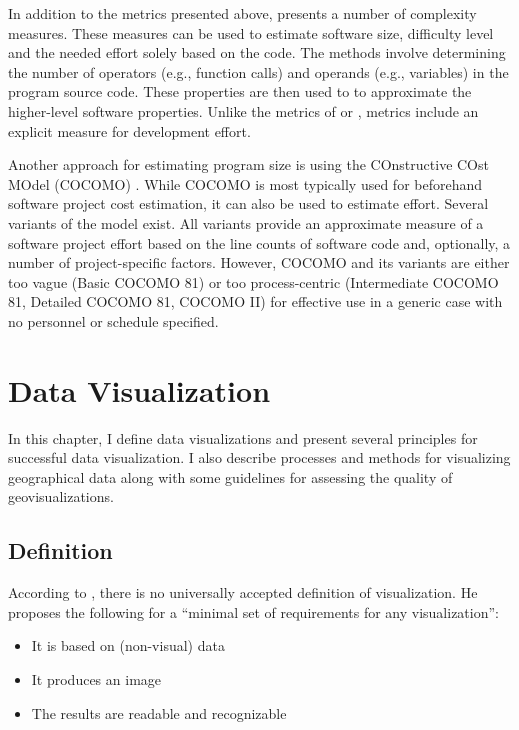 In addition to the metrics presented above, \citet{halstead_elements_1977} presents a number of complexity measures. These measures can be used to estimate software size, difficulty level and the needed effort solely based on the code. The methods involve determining the number of operators (e.g., function calls) and operands (e.g., variables) in the program source code. These properties are then used to to approximate the higher-level software properties. Unlike the metrics of \citeauthor{mccabe_complexity_1976} or \citeauthor{fenton_software_1998}, \citeauthor{halstead_elements_1977} metrics include an explicit measure for development effort.

Another approach for estimating program size is using the COnstructive COst MOdel (COCOMO) \citep{boehm_software_1981}. While COCOMO is most typically used for beforehand software project cost estimation, it can also be used to estimate effort. Several variants of the model exist. All variants provide an approximate measure of a software project effort based on the line counts of software code and, optionally, a number of  project-specific factors. However, COCOMO and its variants are either too vague (Basic COCOMO 81) or too process-centric (Intermediate COCOMO 81, Detailed COCOMO 81, COCOMO II) for effective use in a generic case with no personnel or schedule specified.

\chapter{Data Visualization}
\label{chapter:dataviz}

In this chapter, I define data visualizations and present several principles for successful data visualization. I also describe processes and methods for visualizing geographical data along with some guidelines for assessing the quality of geovisualizations.

\section{Definition}

According to \citet[chap.~3]{kosara_visualization_2007}, there is no universally accepted definition of visualization. He proposes the following for a ``minimal set of requirements for any visualization'':

\begin{itemize}
	\item It is based on (non-visual) data
	\item It produces an image
	\item The results are readable and recognizable
\end{itemize}

